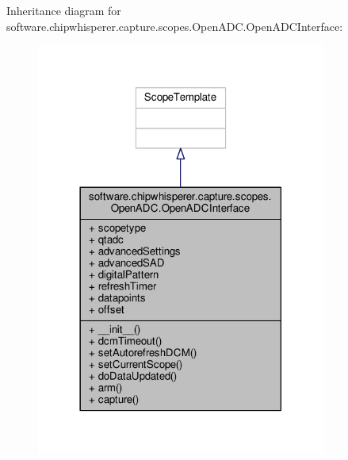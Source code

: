 Inheritance diagram for software.\+chipwhisperer.\+capture.\+scopes.\+Open\+A\+D\+C.\+Open\+A\+D\+C\+Interface\+:\nopagebreak
\begin{figure}[H]
\begin{center}
\leavevmode
\includegraphics[width=270pt]{d4/d98/classsoftware_1_1chipwhisperer_1_1capture_1_1scopes_1_1OpenADC_1_1OpenADCInterface__inherit__graph}
\end{center}
\end{figure}


